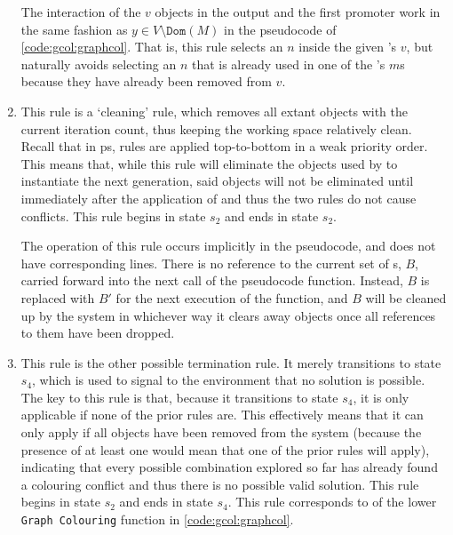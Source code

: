 \begin{enumerate}
The interaction of the \(v\) objects in the output and the first \gls{promoter} work in the same fashion as \(y \in V \setminus \texttt{Dom}(M)\) in the pseudocode of \cref{code:gcol:graphcol}.  That is, this rule selects an \(n\) inside the given \bo{}'s \(v\), but naturally avoids selecting an \(n\) that is already used in one of the \bo{}'s \(m\)s because they have already been removed from \(v\).

\item This rule is a `cleaning' rule, which removes all extant \bo{} objects with the current iteration count, thus keeping the working space relatively clean.  Recall that in \gls{ps}, rules are applied top-to-bottom in a  weak priority order.  This means that, while this rule will eliminate the \bo{} objects used by  to instantiate the next generation, said objects will not be eliminated until immediately after the application of  and thus the two rules do not cause conflicts.  This rule begins in state \(s_2\) and ends in state \(s_2\).

The operation of this rule occurs implicitly in the pseudocode, and does not have corresponding lines.  There is no reference to the current set of \bo{}s, \(B\), carried forward into the next call of the pseudocode function.  Instead, \(B\) is replaced with \(B'\) for the next execution of the function, and \(B\) will be cleaned up by the system in whichever way it clears away objects once all references to them have been dropped.

\item This rule is the other possible termination rule.  It merely transitions to state \(s_4\), which is used to signal to the environment that no solution is possible.  The key to this rule is that, because it transitions to state \(s_4\), it is only applicable if none of the prior rules are.  This effectively means that it can only apply if all \bo{} objects have been removed from the system (because the presence of at least one \bo{} would mean that one of the prior rules will apply), indicating that every possible combination explored so far has already found a colouring conflict and thus there is no possible valid solution.  This rule begins in state \(s_2\) and ends in state \(s_4\).  This rule corresponds to  of the lower \texttt{Graph Colouring} function in \cref{code:gcol:graphcol}.

\end{enumerate}

